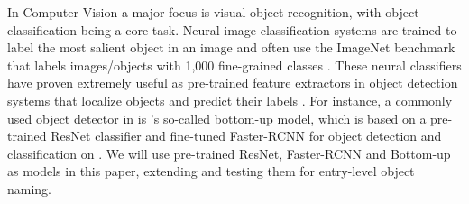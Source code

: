  


In Computer Vision a major focus is visual object recognition, with object classification being a core task. 
Neural image classification systems are trained to label the most salient object in an image and often use the ImageNet \cite{imagenet_cvpr09} benchmark that labels images/objects with 1,000 fine-grained classes \cite{googlenet,he2016deep}. 
These neural classifiers have proven extremely useful %
as pre-trained feature extractors in object detection systems that localize objects and predict their labels \cite{fasterrcnn2015}.
For instance, a commonly used object detector in \lv is \citep{anderson2018updown}'s so-called bottom-up model, which is based on a pre-trained ResNet classifier and fine-tuned Faster-RCNN \cite{fasterrcnn2015} for object detection and classification on \vg. 
We will use pre-trained ResNet, Faster-RCNN and Bottom-up as models in this paper, extending and testing them for entry-level object naming. 

